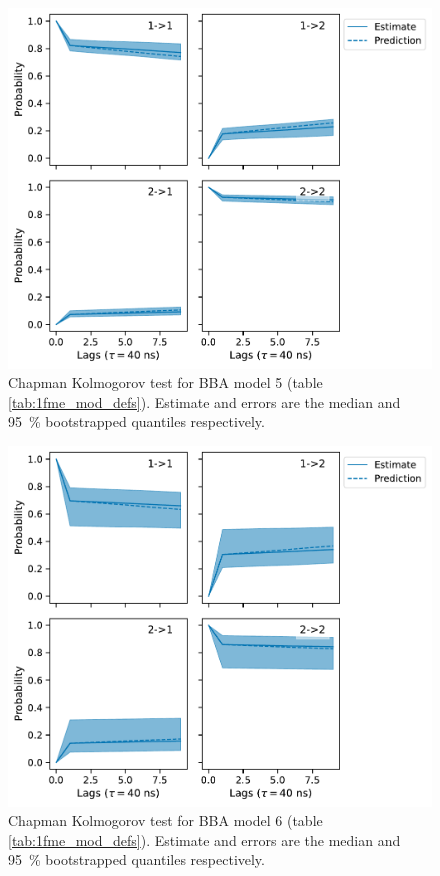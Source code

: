 \documentclass{article}
\begin{document}
\begin{figure}
    \centering
    \includegraphics[height=0.4\textheight]{figures/cktests/bba/m2_dihed_hpix30_cktest.pdf}
    \caption{Chapman Kolmogorov test for BBA model 5 (table \ref{tab:1fme_mod_defs}). Estimate and errors are the median and \SI{95}{\percent} bootstrapped quantiles respectively.}
    \label{fig:cktest_bba_5}
\end{figure}

\begin{figure}
    \centering
    \includegraphics[height=0.4\textheight]{figures/cktests/bba/m2_logit(dist)_hpix91_cktest.pdf}
    \caption{Chapman Kolmogorov test for BBA model 6 (table \ref{tab:1fme_mod_defs}). Estimate and errors are the median and \SI{95}{\percent} bootstrapped quantiles respectively.}
    \label{fig:cktest_bba_6}
\end{figure}
\end{document}
